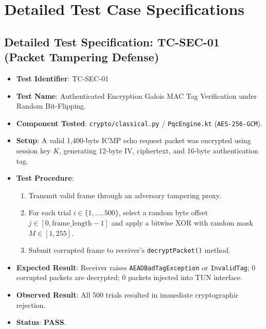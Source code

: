 \section{Detailed Test Case Specifications}

\subsection{Detailed Test Specification: TC-SEC-01 (Packet Tampering Defense)}
\begin{itemize}
    \item \textbf{Test Identifier}: TC-SEC-01
    \item \textbf{Test Name}: Authenticated Encryption Galois MAC Tag Verification under Random Bit-Flipping.
    \item \textbf{Component Tested}: \texttt{crypto/classical.py} / \texttt{PqcEngine.kt} (\texttt{AES-256-GCM}).
    \item \textbf{Setup}: A valid 1,400-byte ICMP echo request packet was encrypted using session key $K$, generating 12-byte IV, ciphertext, and 16-byte authentication tag.
    \item \textbf{Test Procedure}:
    \begin{enumerate}
        \item Transmit valid frame through an adversary tampering proxy.
        \item For each trial $i \in \{1, \dots, 500\}$, select a random byte offset $j \in [0, \text{frame\_length}-1]$ and apply a bitwise XOR with random mask $M \in [1, 255]$.
        \item Submit corrupted frame to receiver's \texttt{decryptPacket()} method.
    \end{enumerate}
    \item \textbf{Expected Result}: Receiver raises \texttt{AEADBadTagException} or \texttt{InvalidTag}; 0 corrupted packets are decrypted; 0 packets injected into TUN interface.
    \item \textbf{Observed Result}: All 500 trials resulted in immediate cryptographic rejection.
    \item \textbf{Status}: \textbf{PASS}.
\end{itemize}


